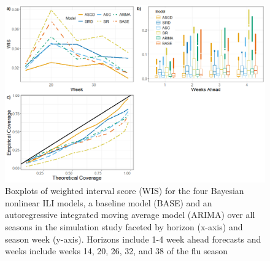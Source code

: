 \begin{figure}[hbt!]
    \includegraphics[scale=.5]{Images/all_sim_res.png}
    \caption{Boxplots of weighted interval score (WIS) for the 
    four Bayesian nonlinear ILI models, a baseline model (BASE) and
    an autoregressive integrated moving average model (ARIMA) 
    over all seasons in the simulation study faceted by horizon 
    (x-axis) and season week (y-axis). Horizons include 1-4 week ahead forecasts 
    and weeks include weeks 14, 20, 26, 32, and 38 of the flu season}
    \label{fig:wis_by_week_horizon}
\end{figure}


